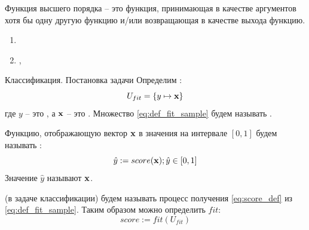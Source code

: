   
  \begin{frame}{Функция высшего порядка}
   -- это функция, принимающая в качестве аргументов хотя бы одну другую функцию и/или возвращающая в качестве выхода функцию.
  
  \begin{enumerate}
  	\item {}
  	\item {}, 
  \end{enumerate}
  
  \end{frame}
  
  \begin{frame}{Классификация. Постановка задачи}\label{frame:classification_def}
  	\small
  	Определим :
  	\begin{equation}\label{eq:def_fit_sample}
  	U_{fit} = \left\{ y \mapsto \bold x  \right\}
  	\end{equation}
  	где $y$ -- это ,
  	а $\bold x$ -- это .
  	Множество \eqref{eq:def_fit_sample} будем называть .
 
  	Функцию, отображающую вектор $\bold x$ в значения на интервале $[0, 1]$ будем 
  	называть :
  	\begin{equation}\label{eq:score_def}
  	\hat{y} := score( \bold x); \hat{y} \in [0, 1]
  	\end{equation}
  	Значение $\hat{y}$ называют   $\bold x$.
  	
  	 (в задаче классификации) будем называть процесс получения 
  	\eqref{eq:score_def} 
  	из 
  	\eqref{eq:def_fit_sample}.
  	Таким образом можно определить  $fit$:
  	\begin{equation}\label{eq:fit_def}
  	score := fit (U_{fit}) 
  	\end{equation}
  \end{frame}


